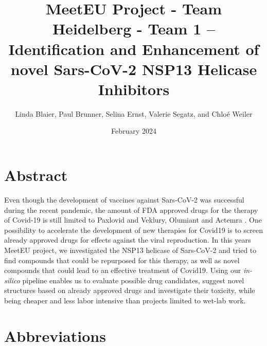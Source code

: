 \documentclass[11pt, letterpaper, titlepage]{article}
\title{MeetEU Project - Team Heidelberg - Team 1 -- \\ Identification and Enhancement of novel Sars-CoV-2 NSP13 Helicase Inhibitors}
\author{Linda Blaier, Paul Brunner, Selina Ernst, Valerie Segatz, and Chlo\'{e} Weiler}
\date{February 2024}
\renewcommand{\cite}{\parencite}
\begin{document}
\maketitle

\ihead{\headmark}
\cfoot{\pagemark}   %

\section{Abstract}
Even though the development of vaccines against Sars-CoV-2 was successful during the recent pandemic, the amount of FDA approved drugs for the therapy of Covid-19 is still limited to Paxlovid and Veklury, Olumiant and Actemra \cite{FDACOVID}. One possibility to accelerate the development of new therapies for Covid19 is to screen already approved drugs for effects against the viral reproduction. In this years MeetEU project, we investigated the NSP13 helicase of Sars-CoV-2 and tried to find compounds that could be repurposed for this therapy, as well as novel compounds that could lead to an effective treatment of Covid19. Using our \textit{in-silico} pipeline enables us to evaluate possible drug candidates, suggest novel structures based on already approved drugs and investigate their toxicity, while being cheaper and less labor intensive than projects limited to wet-lab work. 
\FloatBarrier

\newpage
{\setlength{\parskip}{0.2cm}
\section*{Abbreviations}
    \begin{acronym}[LC-MS/MS23]
       
        
        
        
        
    \end{acronym}
}
\newpage
 
\end{document}
